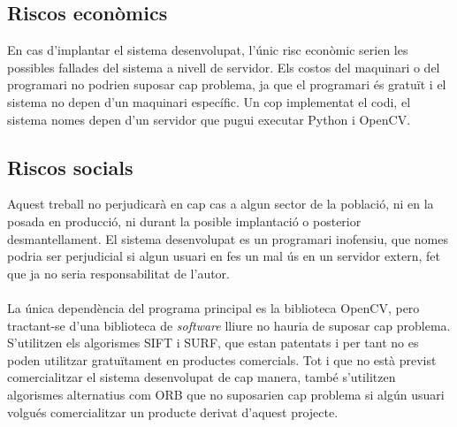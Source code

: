	\subsection{Riscos econòmics}
		En cas d'implantar el sistema desenvolupat, l'únic risc econòmic serien les possibles fallades del sistema a nivell de servidor. Els costos del maquinari o del programari no podrien suposar cap
		problema, ja que el programari és gratuït i el sistema no depen d'un maquinari específic. Un cop implementat el codi, el sistema nomes depen d'un servidor que pugui executar Python i OpenCV.

	\subsection{Riscos socials}
		Aquest treball no perjudicarà en cap cas a algun sector de la població, ni en la posada en producció, ni durant la posible implantació o posterior desmantellament. El sistema desenvolupat es un 
		programari inofensiu, que nomes podria ser perjudicial si algun usuari en fes un mal ús en un servidor extern, fet que ja no seria responsabilitat de l'autor.\\\\
		La única dependència del programa principal es la biblioteca OpenCV, pero tractant-se d'una biblioteca de \textit{software} lliure no hauria de suposar cap problema. S'utilitzen els algorismes
		SIFT i SURF, que estan patentats i per tant no es poden utilitzar gratuïtament en productes comercials. Tot i que no està previst comercialitzar el sistema desenvolupat de cap manera, també s'utilitzen
		algorismes alternatius com ORB que no suposarien cap problema si algún usuari volgués comercialitzar un producte derivat d'aquest projecte.
